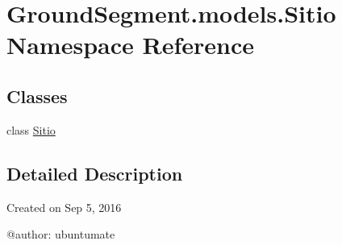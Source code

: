 \hypertarget{namespace_ground_segment_1_1models_1_1_sitio}{}\section{Ground\+Segment.\+models.\+Sitio Namespace Reference}
\label{namespace_ground_segment_1_1models_1_1_sitio}
\subsection*{Classes}
\begin{DoxyCompactItemize}
\item 
class \hyperlink{class_ground_segment_1_1models_1_1_sitio_1_1_sitio}{Sitio}
\end{DoxyCompactItemize}


\subsection{Detailed Description}
\begin{DoxyVerb}Created on Sep 5, 2016

@author: ubuntumate
\end{DoxyVerb}
 